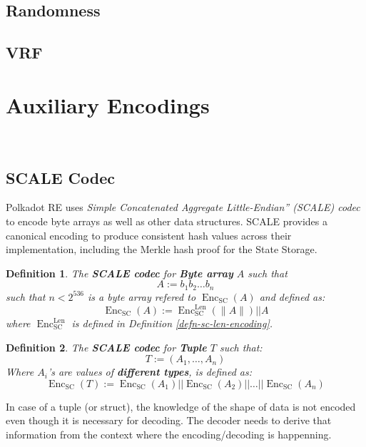 \documentclass{article}
\newcommand{\assign}{:=}
\newcommand{\tmem}[1]{{\em #1\/}}
\newcommand{\tmop}[1]{\ensuremath{\operatorname{#1}}}
\newcommand{\tmstrong}[1]{\textbf{#1}}
\newcommand{\tmtextbf}[1]{{\bfseries{#1}}}
\newcommand{\tmtextit}[1]{{\itshape{#1}}}
\newtheorem{definition}{Definition}
\providecommand{\tmem}[1]{\tmtextit{#1}}
\providecommand{\tmop}[1]{\ensuremath{\mathrm{#1}}}
\providecommand{\tmstrong}[1]{\tmtextbf{#1}}
\providecommand{\tmtextbf}[1]{\tmtextbf{#1}}
\providecommand{\tmtextit}[1]{\tmtextit{#1}}
\newtheorem{definition}{Definition}
\begin{document}
\subsection{Randomness}\label{sect-randomness}

\subsection{VRF}\label{sect-vrf}

\section{Auxiliary Encodings}\label{sect-encoding}

\

\subsection{SCALE Codec}\label{sect-scale-codec}

Polkadot RE uses {\tmem{Simple Concatenated Aggregate Little-Endian'' (SCALE)
codec}} to encode byte arrays as well as other data structures. SCALE provides
a canonical encoding to produce consistent hash values across their
implementation, including the Merkle hash proof for the State Storage.

\begin{definition}
  \label{defn-scale-byte-array}The {\tmstrong{SCALE codec}} for
  {\tmstrong{Byte array}} $A$ such that
  \[ A \assign b_1 b_2 \ldots b_n \]
  such that $n < 2^{536}$ is a byte array refered to $\tmop{Enc}_{\tmop{SC}}
  (A)$ and defined as:
  \[ \tmop{Enc}_{\tmop{SC}} (A) \assign \tmop{Enc}^{\tmop{Len}}_{\tmop{SC}}
     (\| A \|) | | A \]
  where $\tmop{Enc}_{\tmop{SC}}^{\tmop{Len}}$ is defined in Definition
  \ref{defn-sc-len-encoding}. 
\end{definition}

\begin{definition}
  \label{defn-scale-tuple}The {\tmstrong{SCALE codec}} for {\tmstrong{Tuple}}
  $T$ such that:
  \[ T \assign (A_1, \ldots, A_n) \]
  Where $A_i$'s are values of {\tmstrong{different types}}, is defined as:
  \[ \tmop{Enc}_{\tmop{SC}} (T) \assign \tmop{Enc}_{\tmop{SC}} (A_1) | |
     \tmop{Enc}_{\tmop{SC}} (A_2) | | \ldots | | \tmop{Enc}_{\tmop{SC}} (A_n)
  \]
\end{definition}

In case of a tuple (or struct), the knowledge of the shape of data is not
encoded even though it is necessary for decoding. The decoder needs to derive
that information from the context where the encoding/decoding is happenning.
\end{document}
